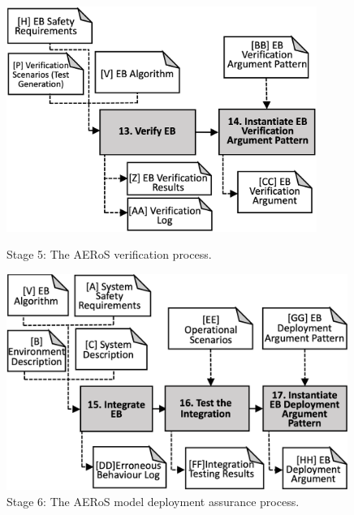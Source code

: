 \documentclass[runningheads]{llncs}
\begin{document}
\begin{figure}[!t]
	\centering
	\begin{minipage}{.5\textwidth}
		\centering
		\includegraphics[width=0.9\textwidth]{figures/AMLAS-STAGE-5-V4.png}%
		\vspace{-2ex}
		\caption{Stage 5: The AERoS verification process.}
		\label{amlas-a-stage5}
	\end{minipage}%
	\begin{minipage}{.5\textwidth}
		\centering
		\includegraphics[width=0.99\textwidth]{figures/AMLAS-STAGE-6-V5.png}%
		\vspace{-2ex}
		\caption{Stage 6: The AERoS model \newline deployment assurance process.}
		\label{amlas-a-stage6}
	\end{minipage}
	\vspace{-4ex}
\end{figure}
\end{document}
